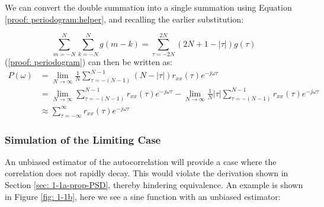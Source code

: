 \documentclass[12pt]{article}
\begin{document}
	We can convert the double summation into a single summation using Equation \ref{proof: periodogram:helper}, and recalling the earlier substitution:
	
	\begin{equation}
		\sum_{m=-N}^{N} \sum_{k=-N}^{N} g(m-k) = \sum_{\tau=-2N}^{2N}(2N + 1 - |\tau|)g(\tau)
		\label{proof: periodogram:helper}
	\end{equation}
	\newline
	(\ref{proof: periodogram}) can then be written as:
	\vspace{-\baselineskip}
	\begin{align}
		P(\omega)    & =         \lim_{N\to\infty} \frac{1}{N} \sum_{\tau=-(N-1)}^{N-1}(N - |\tau|)r_{xx}(\tau) e^{-j\omega\tau}\nonumber\\
		& =         \lim_{N\to\infty} \sum_{\tau=-(N-1)}^{N-1} r_{xx}(\tau) e^{-j\omega\tau} -
		\lim_{N\to\infty} \frac{1}{N} |\tau| \sum_{\tau=-(N-1)}^{N-1} r_{xx}(\tau) e^{-j\omega\tau}\nonumber\\
		& \approx   \sum_{\tau=-\infty}^{\infty} r_{xx}(\tau) e^{-j\omega\tau}
		\label{proof: periodogram:shown}
	\end{align}
	
	\subsubsection{Simulation of the Limiting Case} \label{sec: 1-1b-prop-PSD}
	
	An unbiased estimator of the autocorrelation will provide a case where the correlation does not rapidly decay. This would violate the derivation shown in Section \ref{sec: 1-1a-prop-PSD}, thereby hindering equivalence.
	An example is shown in Figure \ref{fig: 1-1b}, here we see a sine function with an unbiased estimator:
	
\end{document}
